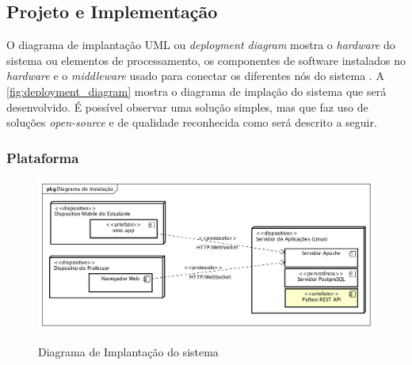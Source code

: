\subsection{Projeto e Implementação}
O diagrama de implantação UML ou \textit{deployment diagram} mostra o \textit{hardware}
do sistema ou elementos de processamento, os componentes de software instalados
no \textit{hardware} e o \textit{middleware} usado para conectar os diferentes
nós do sistema \cite{Pressman2009}. A \autoref{fig:deployment_diagram} mostra
o diagrama de implação do sistema que será desenvolvido. É possível observar
uma solução simples, mas que faz uso de soluções \textit{open-source} e de
qualidade reconhecida como será descrito a seguir.

\subsubsection{Plataforma}

\begin{figure}[!b]
  \centering
  \caption{Diagrama de Implantação do sistema}
  \includegraphics[width=1\textwidth]{imagens/deployment_diagram}
  \label{fig:deployment_diagram}
\end{figure}

